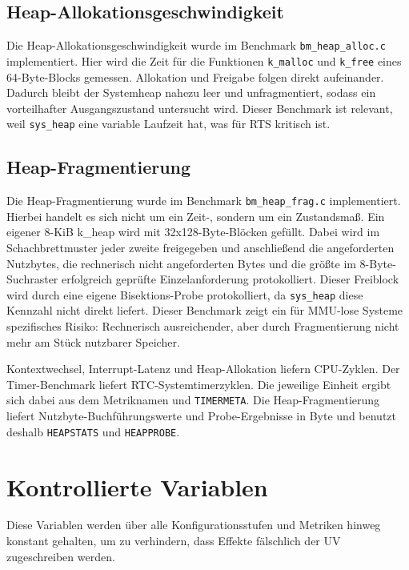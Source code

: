 \subsection{Heap-Allokationsgeschwindigkeit}
Die Heap-Allokationsgeschwindigkeit wurde im Benchmark \lstinline[style=codeinline]|bm_heap_alloc.c| implementiert. Hier wird die Zeit f{\"u}r die Funktionen \lstinline[style=codeinline]|k_malloc| und \lstinline[style=codeinline]|k_free| eines 64-Byte-Blocks gemessen. Allokation und Freigabe folgen direkt aufeinander. Dadurch bleibt der Systemheap nahezu leer und unfragmentiert, sodass ein vorteilhafter Ausgangszustand untersucht wird. Dieser Benchmark ist relevant, weil \lstinline[style=codeinline]|sys_heap| eine variable Laufzeit hat, was f{\"u}r RTS kritisch ist.

\subsection{Heap-Fragmentierung}
Die Heap-Fragmentierung wurde im Benchmark \lstinline[style=codeinline]|bm_heap_frag.c| implementiert. Hierbei handelt es sich nicht um ein Zeit-, sondern um ein Zustandsma{\ss}. Ein eigener 8-KiB k\_heap wird mit 32x128-Byte-Bl{\"o}cken gef{\"u}llt. Dabei wird im Schachbrettmuster jeder zweite freigegeben und anschlie{\ss}end die angeforderten Nutzbytes, die rechnerisch nicht angeforderten Bytes und die gr{\"o}{\ss}te im 8-Byte-Suchraster erfolgreich gepr{\"u}fte Einzelanforderung protokolliert. Dieser Freiblock wird durch eine eigene Bisektions-Probe protokolliert, da \lstinline[style=codeinline]|sys_heap| diese Kennzahl nicht direkt liefert. Dieser Benchmark zeigt ein f{\"u}r MMU-lose Systeme spezifisches Risiko: Rechnerisch ausreichender, aber durch Fragmentierung nicht mehr am St{\"u}ck nutzbarer Speicher.

Kontextwechsel, Interrupt-Latenz und Heap-Allokation liefern CPU-Zyklen. Der Timer-Benchmark liefert RTC-Systemtimerzyklen. Die jeweilige Einheit ergibt sich dabei aus dem Metriknamen und \lstinline[style=codeinline]|TIMERMETA|. Die Heap-Fragmentierung liefert Nutzbyte-Buchf{\"u}hrungswerte und Probe-Ergebnisse in Byte und benutzt deshalb \lstinline[style=codeinline]|HEAPSTATS| und \lstinline[style=codeinline]|HEAPPROBE|.

\section{Kontrollierte Variablen}
Diese Variablen werden {\"u}ber alle Konfigurationsstufen und Metriken hinweg konstant gehalten, um zu verhindern, dass Effekte f{\"a}lschlich der UV zugeschreiben werden.

